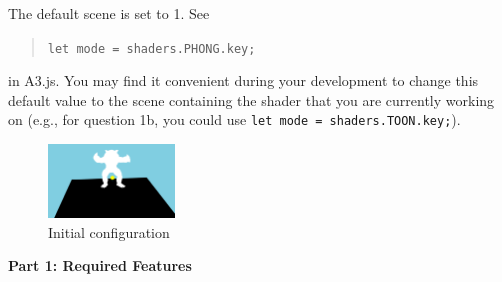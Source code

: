 \documentclass[12pt]{exam}
\begin{document}
\vspace{0.5cm}

The default scene is set to 1. See
\begin{quotation}
\verb|let mode = shaders.PHONG.key;|
\end{quotation}
in A3.js. You may find  
it convenient during your development to change this default value to the scene containing
the shader that you are currently working on (e.g., for question 1b, you could use
\verb|let mode = shaders.TOON.key;|).

\begin{figure}[H]
    \centering
    \includegraphics[width=0.3\textwidth]{./init.png}
    \caption{Initial configuration}
\end{figure}

\clearpage

{\bf Part 1: Required Features}
\end{document}
